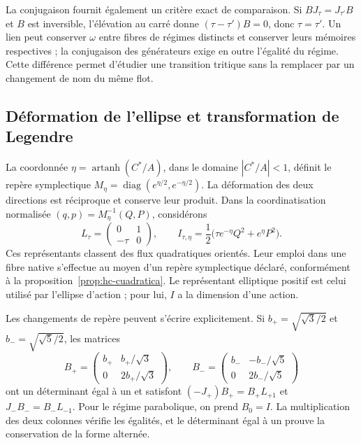 La conjugaison fournit également un critère exact de comparaison.
Si \(BJ_\tau=J_{\tau'}B\) et \(B\) est inversible, l’élévation au carré
donne \((\tau-\tau')B=0\), donc \(\tau=\tau'\). Un lien peut
conserver \(\omega\) entre fibres de régimes distincts et conserver
leurs mémoires respectives ; la conjugaison des générateurs exige en outre
l’égalité du régime. Cette différence permet d’étudier une transition
tritique sans la remplacer par un changement de nom du même flot.

\subsection{Déformation de l'ellipse et transformation de Legendre}

La coordonnée \(\eta=\operatorname{artanh}(C^*/A)\), dans le domaine \(|C^*/A|<1\), définit le repère symplectique \(M_\eta=\operatorname{diag}(e^{\eta/2},e^{-\eta/2})\). La déformation des deux directions est réciproque et conserve leur produit. Dans la coordinatisation normalisée \((q,p)=M_\eta^{-1}(Q,P)\), considérons
\[
 L_\tau=\begin{pmatrix}0&1\\-\tau&0\end{pmatrix},\qquad
 I_{\tau,\eta}=\frac12\bigl(\tau e^{-\eta}Q^2+e^\eta P^2\bigr).
\]
Ces représentants classent des flux quadratiques orientés. Leur emploi
dans une fibre native s’effectue au moyen d’un repère symplectique déclaré,
conformément à la proposition~\ref{prop:hc-cuadratica}. Le représentant
elliptique positif est celui utilisé par l’ellipse d’action ; pour lui, \(I\)
a la dimension d’une action.

Les changements de repère peuvent s'écrire explicitement. Si \(b_+=\sqrt{\sqrt3/2}\) et \(b_-=\sqrt{\sqrt5/2}\), les matrices
\[
 B_+=\begin{pmatrix}b_+&b_+/\sqrt3\\0&2b_+/\sqrt3\end{pmatrix},
 \qquad
 B_-=\begin{pmatrix}b_-&-b_-/\sqrt5\\0&2b_-/\sqrt5\end{pmatrix}
\]
ont un déterminant égal à un et satisfont \( (-J_+)B_+=B_+L_{+1}\) et \(J_-B_-=B_-L_{-1}\). Pour le régime parabolique, on prend \(B_0=I\). La multiplication des deux colonnes vérifie les égalités, et le déterminant égal à un prouve la conservation de la forme alternée.

